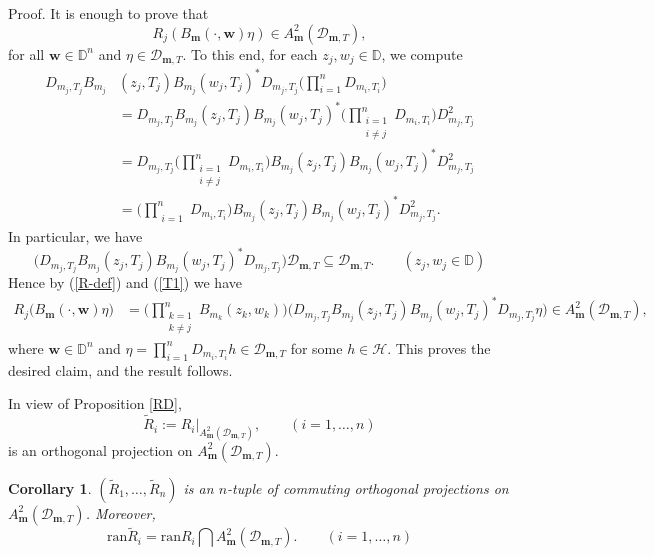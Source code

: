 \documentclass[12pt]{amsart}
\newtheorem{Corollary}[Theorem]{\sc Corollary}
\begin{document}
{\noindent}\textsf{Proof.} It is enough to prove that
\[R_j (B_{\bm{m}}(\cdot, {\bm{w}}) \eta ) \in
A^2_{\bm{m}}({\mathcal{D}_{\bm{m},T}}),\]for all ${\bm{w}} \in {\mathbb{D}}^n$ and $\eta \in
{\mathcal{D}_{\bm{m},T}}$. To this end, for each $z_j, w_j \in {\mathbb{D}}$, we compute \[\begin{split} D_{m_j, T_j} B_{m_j} & (z_j,
T_j) B_{m_j}(w_j, T_j)^* D_{m_j, T_j} \Big(\prod_{i=1}^n D_{m_i,
T_i}\Big) \\ & =  D_{m_j, T_j} B_{m_j}(z_j, T_j) B_{m_j}(w_j, T_j)^*
\Big(\prod_{\substack{{i=1}\\i \neq j}}^n D_{m_i, T_i}\Big)
D^2_{m_j, T_j} \\ & =  D_{m_j, T_j} \Big(\prod_{\substack{{i=1}\\i
\neq j}}^n D_{m_i, T_i}\Big) B_{m_j}(z_j, T_j) B_{m_j}(w_j, T_j)^*
D^2_{m_j, T_j} \\ & = \Big(\prod_{\substack{{i=1}}}^n D_{m_i,
T_i}\Big) B_{m_j}(z_j, T_j) B_{m_j}(w_j, T_j)^* D^2_{m_j, T_j}.
\end{split}\]In particular, we have \[\Big(D_{m_j, T_j} B_{m_j} (z_j, T_j)
B_{m_j}(w_j, T_j)^* D_{m_j, T_j}\Big) {\mathcal{D}_{\bm{m},T}} \subseteq {\mathcal{D}_{\bm{m},T}}.\quad \quad
(z_j, w_j \in {\mathbb{D}})\]Hence by (\ref{R-def}) and (\ref{T1}) we
have
\[\begin{split}R_j \Big( B_{\bm{m}}(\cdot, {\bm{w}}) \eta \Big) & =
\Big(\prod_{\substack{{k=1}\\k \neq j}}^n B_{m_k}(z_k, w_k)\Big)
\Big(D_{m_j, T_j} B_{m_j}(z_j, T_j) B_{m_j}(w_j, T_j)^* D_{m_j, T_j}
\eta\Big) \in A^2_{\bm{m}}({\mathcal{D}_{\bm{m},T}}), \end{split}\]where ${\bm{w}} \in {\mathbb{D}}^n$ and
$\eta = \prod_{i=1}^n D_{m_i, T_i} h \in {\mathcal{D}_{\bm{m},T}}$ for some $h \in {\mathcal{H}}$.
This proves the desired claim, and the result follows. {\hfill \vrule height6pt width 6pt depth 0pt}

In view of Proposition \ref{RD},
\begin{equation}\label{Rtilde}\tilde{R}_i := R_i|_{A^2_{\bm{m}}({\mathcal{D}_{\bm{m},T}})},
\quad \quad (i = 1, \ldots, n)\end{equation}is an orthogonal
projection on $A^2_{\bm{m}}({\mathcal{D}_{\bm{m},T}})$.

\begin{Corollary}
$(\tilde{R}_1, \ldots, \tilde{R}_n)$ is an $n$-tuple of commuting orthogonal
projections on $A^2_{\bm{m}}({\mathcal{D}_{\bm{m},T}})$. Moreover, \[\mbox{ran} \tilde{R}_i =
\mbox{ran} R_i \bigcap A^2_{\bm{m}}({\mathcal{D}_{\bm{m},T}}). \quad \quad (i = 1, \ldots,
n)\]
\end{Corollary}
\end{document}
